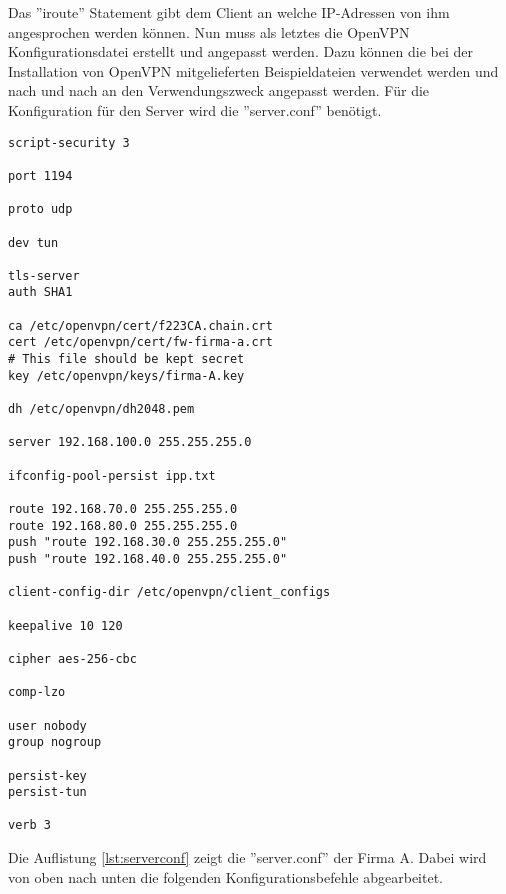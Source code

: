 \vspace{\baselineskip}
Das ''iroute'' Statement gibt dem Client an welche IP-Adressen von ihm angesprochen werden können. \newline Nun muss als letztes die OpenVPN Konfigurationsdatei erstellt und angepasst werden. Dazu können die bei der Installation von OpenVPN mitgelieferten Beispieldateien verwendet werden und nach und nach an den Verwendungszweck angepasst werden. Für die Konfiguration für den Server wird die ''server.conf'' benötigt.\newline
\lstset{
	basicstyle=\footnotesize, frame=tb,
	xleftmargin=.2\textwidth, xrightmargin=.2\textwidth
}
\begin{lstlisting}[caption={server.conf Datei der Firma A},label=lst:serverconf]
script-security 3

port 1194

proto udp

dev tun

tls-server
auth SHA1

ca /etc/openvpn/cert/f223CA.chain.crt
cert /etc/openvpn/cert/fw-firma-a.crt
# This file should be kept secret
key /etc/openvpn/keys/firma-A.key  

dh /etc/openvpn/dh2048.pem

server 192.168.100.0 255.255.255.0

ifconfig-pool-persist ipp.txt

route 192.168.70.0 255.255.255.0
route 192.168.80.0 255.255.255.0
push "route 192.168.30.0 255.255.255.0"
push "route 192.168.40.0 255.255.255.0"

client-config-dir /etc/openvpn/client_configs

keepalive 10 120

cipher aes-256-cbc

comp-lzo

user nobody	
group nogroup

persist-key
persist-tun

verb 3

\end{lstlisting}
\vspace{\baselineskip}
Die Auflistung \ref{lst:serverconf} zeigt die ''server.conf'' der Firma A. Dabei wird von oben nach unten die folgenden Konfigurationsbefehle abgearbeitet.
